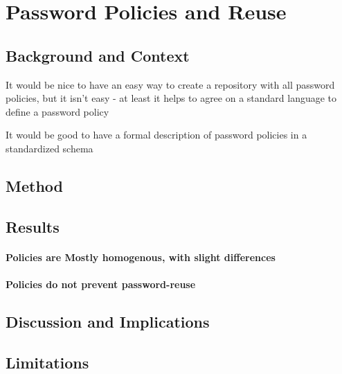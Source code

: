 \chapter[Password Policies and Reuse]{Password Policies and Reuse}\label{chap:policies_reuse}
\section{Background and Context}

	It would be nice to have an easy way to create a repository with all password policies, but it isn't easy - at least it helps to agree on a standard language to define a password policy \cite{Steves2015PasswordPolicyLanguage}

It would be good to have a formal description of password policies in a standardized schema \cite{Horsch2016PasswordPolicyMarkup}

\section{Method}

\section{Results}
\subsubsection{Policies are Mostly homogenous, with slight differences}
\subsubsection{Policies do not prevent password-reuse}

\section{Discussion and Implications}

\section{Limitations}
